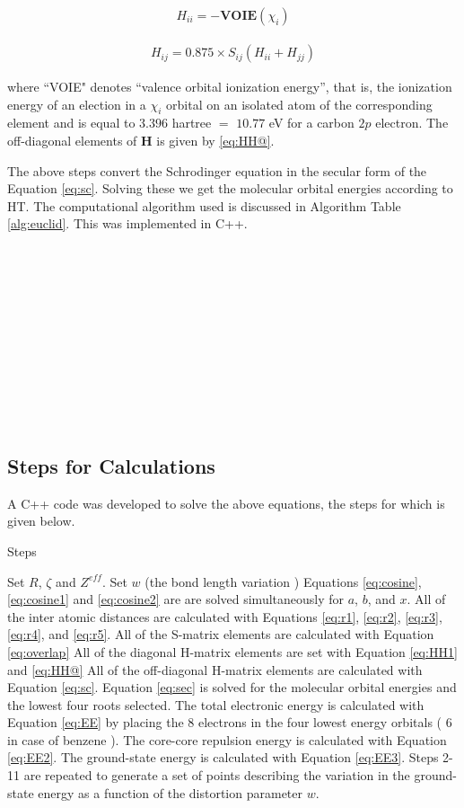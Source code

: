 \documentclass[9pt,twocolumn,twoside]{optica}
\begin{document}
\begin{align}
H_{ii}=-\textbf{VOIE}(\chi_i)
\label{eq:HH1}
\end{align}

\begin{align}
H_{ij}=0.875\times S_{ij} (H_{ii}+H_{jj})
\label{eq:HH@}
\end{align}

where ``VOIE" denotes “valence orbital ionization energy”, that is, the ionization energy of an election in a $\chi_i$ orbital on an isolated atom of the corresponding element and is equal to  $3.396$ hartree $=$ $10.77$ eV for a carbon $2p$ electron. The off-diagonal elements of \textbf{H} is given by \ref{eq:HH@}.

The above steps convert the Schrodinger equation in the secular form of the Equation \ref{eq:sc}. Solving these we get the molecular orbital energies according to HT. The computational algorithm used is discussed in Algorithm Table \ref{alg:euclid}. This was implemented in C++. \\\\\\\\\\\\\\\\\\\\\\\\


\subsection{Steps for Calculations}
A C++ code was developed to solve the above equations, the steps for which is given below.
\begin{algorithm}
\caption{Steps}\label{alg:euclid}
\begin{algorithmic}[1]
\State Set $R$, $\zeta$ and $Z^{eff}$.
\State Set $w$ (the bond length variation )
\State Equations \ref{eq:cosine}, \ref{eq:cosine1} and  \ref{eq:cosine2}  are are solved simultaneously for $a$, $b$, and $x$.
\State All of the inter atomic distances are calculated with Equations \ref{eq:r1}, \ref{eq:r2}, \ref{eq:r3}, \ref{eq:r4}, and  \ref{eq:r5}.
\State All of the S-matrix elements are calculated with Equation  \ref{eq:overlap}
\State All of the diagonal H-matrix elements are set with Equation \ref{eq:HH1} and 
\ref{eq:HH@}
\State All of the off-diagonal H-matrix elements are calculated with Equation \ref{eq:sc}.
\State Equation \ref{eq:sec} is solved for the molecular orbital energies and the lowest four roots selected.
\State The total electronic energy is calculated with Equation \ref{eq:EE} by
placing the 8 electrons in the four lowest energy orbitals ( 6 in case of benzene ).
\State The core-core repulsion energy is calculated with Equation \ref{eq:EE2}.
\State The ground-state energy is calculated with Equation \ref{eq:EE3}.
\State Steps 2-11 are repeated to generate a set of points
describing the variation in the ground-state energy as a
function of the distortion parameter $w$.
\end{algorithmic}
\end{algorithm}
\end{document}
